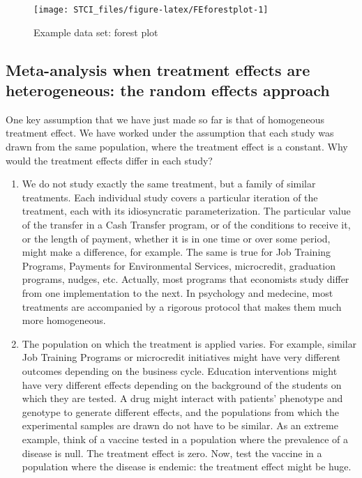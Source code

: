 \documentclass[
]{book}
\providecommand{\tightlist}{%
  \setlength{\itemsep}{0pt}\setlength{\parskip}{0pt}}
\theoremstyle{definition}
\theoremstyle{definition}
\theoremstyle{definition}
\theoremstyle{definition}
\theoremstyle{remark}
\begin{document}
\begin{figure}[htbp]

{\centering \texttt{[image: STCI\_files/figure-latex/FEforestplot-1]} 

}

\caption{Example data set: forest plot}\label{fig:FEforestplot}
\end{figure}

\hypertarget{meta-analysis-when-treatment-effects-are-heterogeneous-the-random-effects-approach}{%
\subsection{Meta-analysis when treatment effects are heterogeneous: the random effects approach}\label{meta-analysis-when-treatment-effects-are-heterogeneous-the-random-effects-approach}}

One key assumption that we have just made so far is that of homogeneous treatment effect.
We have worked under the assumption that each study was drawn from the same population, where the treatment effect is a constant.
Why would the treatment effects differ in each study?

\begin{enumerate}
\def\labelenumi{\arabic{enumi}.}
\tightlist
\item
  We do not study exactly the same treatment, but a family of similar treatments.
  Each individual study covers a particular iteration of the treatment, each with its idiosyncratic parameterization.
  The particular value of the transfer in a Cash Transfer program, or of the conditions to receive it, or the length of payment, whether it is in one time or over some period, might make a difference, for example.
  The same is true for Job Training Programs, Payments for Environmental Services, microcredit, graduation programs, nudges, etc.
  Actually, most programs that economists study differ from one implementation to the next.
  In psychology and medecine, most treatments are accompanied by a rigorous protocol that makes them much more homogeneous.
\item
  The population on which the treatment is applied varies.
  For example, similar Job Training Programs or microcredit initiatives might have very different outcomes depending on the business cycle.
  Education interventions might have very different effects depending on the background of the students on which they are tested.
  A drug might interact with patients' phenotype and genotype to generate different effects, and the populations from which the experimental samples are drawn do not have to be similar.
  As an extreme example, think of a vaccine tested in a population where the prevalence of a disease is null.
  The treatment effect is zero.
  Now, test the vaccine in a population where the disease is endemic: the treatment effect might be huge.
\end{enumerate}
\end{document}
